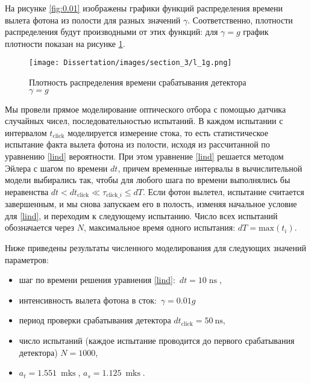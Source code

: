 На рисунке \ref{fig:0.01} изображены графики функций распределения времени вылета фотона из полости для разных значений $\gamma$. Соответственно, плотности распределения будут производными от этих функций: для $\gamma=g$ график плотности показан на рисунке \ref{fig:dP1}. 

\begin{figure}[ht!]
	\noindent\centering\texttt{[image: Dissertation/images/section\_3/l\_1g.png]}
	\captionsetup{format=hang,width=0.95\textwidth,justification=centering,singlelinecheck=no}
	\caption{
		{\small
			Плотность распределения времени срабатывания детектора\\
			$\gamma = g$
		}
	}
	\label{fig:dP1}
\end{figure}

Мы провели прямое моделирование оптического отбора с помощью датчика случайных чисел, последовательностью испытаний. 
В каждом испытании с интервалом $t_{\mathop{\text{click}}}$ моделируется измерение стока, то есть статистическое испытание факта вылета фотона из полости, исходя из рассчитанной по уравнению \eqref{lind} вероятности. При этом уравнение \eqref{lind} решается методом Эйлера с шагом по времени $dt$, причем временные интервалы в вычислительной модели выбирались так, чтобы для любого шага по времени выполнялись бы неравенства $dt<dt_{\mathop{\text{click}}}\ll \tau_{\text{click}\_i}\leq dT$. Если фотон вылетел, испытание считается завершенным, и мы снова запускаем его в полость, изменяя начальное условие для \eqref{lind}, и переходим к следующему испытанию. Число всех испытаний обозначается через $N$, максимальное время одного испытания: $dT=\text{max}(t_i)$.

Ниже приведены результаты численного моделирования для следующих значений параметров: 
\begin{itemize}
	\item{шаг по времени решения уравнения \eqref{lind}:\ $dt = 10 \mathop{\text{ns}}$,}
	\item{интенсивность вылета фотона в сток:\ $\gamma = 0.01g$ }
	\item{период проверки срабатывания детектора $dt_{\mathop{\text{click}}}=50~\text{ns}$, }
	\item{число испытаний (каждое испытание проводится до первого срабатывания детектора) $N = 1000$,}
	\item{$a_t = 1.551\ \mathop{\text{mks}}$, $a_s = 1.125\ \mathop{\text{mks}}$.}
\end{itemize}

